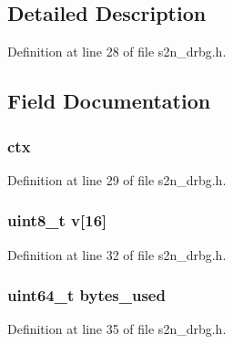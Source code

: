 \subsection{Detailed Description}


Definition at line 28 of file s2n\+\_\+drbg.\+h.



\subsection{Field Documentation}
\subsubsection[{\texorpdfstring{ctx}{ctx}}]{ ctx}\hypertarget{structs2n__drbg_a2495707d38554dedf142a99b04a278f8}{}\label{structs2n__drbg_a2495707d38554dedf142a99b04a278f8}


Definition at line 29 of file s2n\+\_\+drbg.\+h.

\subsubsection[{\texorpdfstring{v}{v}}]{\setlength{\rightskip}{0pt plus 5cm}uint8\+\_\+t v\mbox{[}16\mbox{]}}\hypertarget{structs2n__drbg_a8fb0f890ca029f9724fc198f115c05f3}{}\label{structs2n__drbg_a8fb0f890ca029f9724fc198f115c05f3}


Definition at line 32 of file s2n\+\_\+drbg.\+h.

\subsubsection[{\texorpdfstring{bytes\+\_\+used}{bytes_used}}]{\setlength{\rightskip}{0pt plus 5cm}uint64\+\_\+t bytes\+\_\+used}\hypertarget{structs2n__drbg_a7c90d12780b79aa1cf6b15efa0c03106}{}\label{structs2n__drbg_a7c90d12780b79aa1cf6b15efa0c03106}


Definition at line 35 of file s2n\+\_\+drbg.\+h.

